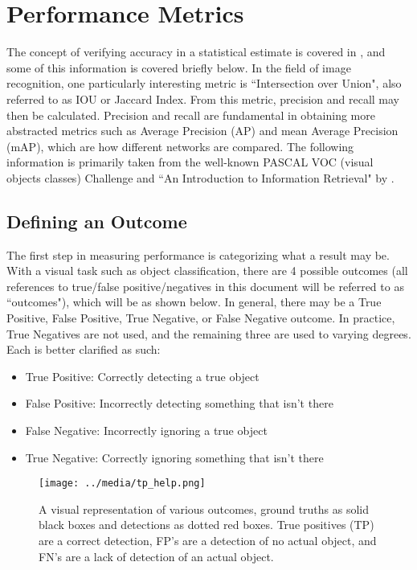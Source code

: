 

\section{Performance Metrics}
\label{appendix_metrics}
The concept of verifying accuracy in a statistical estimate is covered in \cite{manning_introduction_2008}, and some of this information is covered briefly below. In the field of image recognition, one particularly interesting metric is ``Intersection over Union", also referred to as IOU or Jaccard Index. From this metric, precision and recall may then be calculated. Precision and recall are fundamental in obtaining more abstracted metrics such as Average Precision (AP) and mean Average Precision (mAP), which are how different networks are compared. The following information is primarily taken from the well-known PASCAL VOC (visual objects classes) Challenge \cite{everingham_pascal_2010} and ``An Introduction to Information Retrieval" by \cite{manning_introduction_2008}.

\subsection{Defining an Outcome}
The first step in measuring performance is categorizing what a result may be. With a visual task such as object classification, there are 4 possible outcomes (all references to true/false positive/negatives in this document will be referred to as ``outcomes"), which will be  as shown below. In general, there may be a True Positive, False Positive, True Negative, or False Negative outcome. In practice, True Negatives are not used, and the remaining three are used to varying degrees. Each is better clarified as such:
\begin{itemize} \itemsep=-.5em
	\item True Positive: Correctly detecting a true object
	\item False Positive: Incorrectly detecting something that isn't there
	\item False Negative: Incorrectly ignoring a true object
	\item True Negative: Correctly ignoring something that isn't there
\end{itemize}

\begin{figure}[ht]
	\centering
	\texttt{[image: ../media/tp\_help.png]}
	\caption{A visual representation of various outcomes, ground truths as solid black boxes and detections as dotted red boxes. True positives (TP) are a correct detection, FP's are a detection of no actual object, and FN's are a lack of detection of an actual object.}
	\label{tp_help}
\end{figure}

